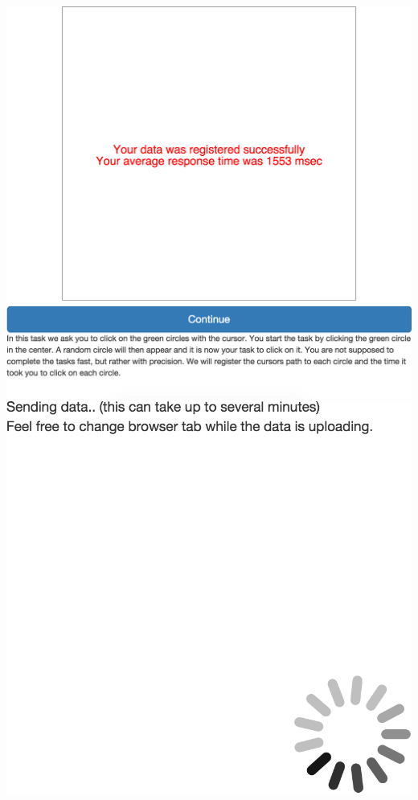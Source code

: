 \begin{appendices}
\begin{minipage}{\textwidth}
\centering
\includegraphics[height=.4\textheight]{images/screenshots/ex_step_6_pointing_done}
\label{fig:ex_step_6_pointing_done}
\includegraphics[height=.4\textheight]{images/screenshots/ex_step_7_sending}
\label{fig:ex_step_7_sending}
\end{minipage}


\end{appendices}
